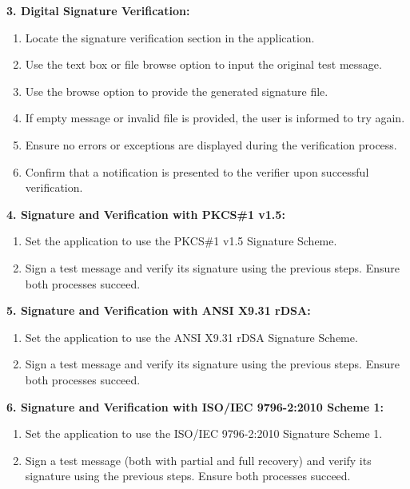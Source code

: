 \documentclass[]{final_report}
\theoremstyle{definition}
\begin{document}
\textbf{3. Digital Signature Verification:}
\begin{enumerate}
\item Locate the signature verification section in the application.
\item Use the text box or file browse option to input the original test message.
\item Use the browse option to provide the generated signature file.
\item If empty message or invalid file is provided, the user is informed to try again. 
\item Ensure no errors or exceptions are displayed during the verification process.
\item Confirm that a notification is presented to the verifier upon successful verification.
\end{enumerate}

\textbf{4. Signature and Verification with PKCS\#1 v1.5:}
\begin{enumerate}
\item Set the application to use the PKCS\#1 v1.5 Signature Scheme.
\item Sign a test message and verify its signature using the previous steps. Ensure both processes succeed.
\end{enumerate}

\textbf{5. Signature and Verification with ANSI X9.31 rDSA:}
\begin{enumerate}
\item Set the application to use the ANSI X9.31 rDSA Signature Scheme.
\item Sign a test message and verify its signature using the previous steps. Ensure both processes succeed.
\end{enumerate}

\textbf{6. Signature and Verification with ISO/IEC 9796-2:2010 Scheme 1:}
\begin{enumerate}
\item Set the application to use the ISO/IEC 9796-2:2010 Signature Scheme 1.
\item Sign a test message (both with partial and full recovery) and verify its signature using the previous steps. Ensure both processes succeed.
\end{enumerate}
\end{document}
